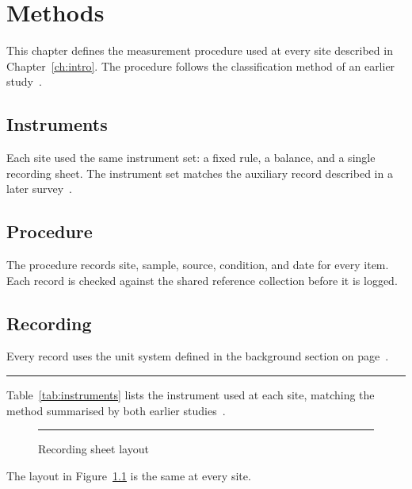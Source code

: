 \chapter{Methods}\label{ch:methods}
This chapter defines the measurement procedure used at every site
described in Chapter~\ref{ch:intro}. The procedure follows the
classification method of an earlier study~\cite{smith2020}.

\section{Instruments}\label{sec:instruments}
Each site used the same instrument set: a fixed rule, a balance, and
a single recording sheet. The instrument set matches the auxiliary
record described in a later survey~\cite{doe2021}.

\section{Procedure}\label{sec:procedure}
The procedure records site, sample, source, condition, and date for
every item. Each record is checked against the shared reference
collection before it is logged.

\section{Recording}\label{sec:recording}
Every record uses the unit system defined in the background section
on page~\pageref{sec:background}.

\begin{table}[ht!]
  \rule{6cm}{2cm}
  \caption{Instrument assignment per site}
  \label{tab:instruments}
\end{table}

Table~\ref{tab:instruments} lists the instrument used at each site,
matching the method summarised by both earlier
studies~\cite{smith2020,doe2021}.

\begin{figure}[ht!]
  \rule{3cm}{2cm}
  \caption{Recording sheet layout}
  \label{fig:sheet}
\end{figure}

The layout in Figure~\ref{fig:sheet} is the same at every site.
